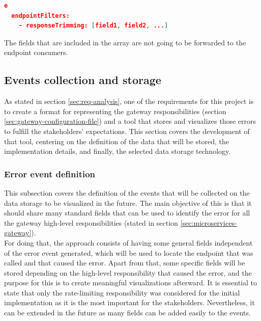 \documentclass[english, 12pt, a4paper, sci, utf8, a-1b, online]{aaltothesis}
\begin{document}
\begin{lstlisting}[language=json,firstnumber=1]e
  endpointFilters:
    - responseTrimming: [field1, field2, ...]
\end{lstlisting}

The fields that are included in the array are not going to be forwarded to the endpoint consumers.


\subsection{Events collection and storage}



As stated in section \ref{sec:req-analysis}, one of the requirements for this project is to create a format for representing the gateway responsibilities (section \ref{sec:gateway-configuration-file}) and a tool that stores and visualizes those errors to fulfill the stakeholders' expectations. This section covers the development of that tool, centering on the definition of the data that will be stored, the implementation details, and finally, the selected data storage technology.

\subsubsection{Error event definition}
\label{sec:error-event-definition}

This subsection covers the definition of the events that will be collected on the data storage to be visualized in the future. The main objective of this is that it should share many standard fields that can be used to identify the error for all the gateway high-level responsibilities (stated in section \ref{sec:microservices-gateway}).\\

For doing that, the approach consists of having some general fields independent of the error event generated, which will be used to locate the endpoint that was called and that caused the error. Apart from that, some specific fields will be stored depending on the high-level responsibility that caused the error, and the purpose for this is to create meaningful visualizations afterward. It is essential to state that only the rate-limiting responsibility was considered for the initial implementation as it is the most important for the stakeholders. Nevertheless, it can be extended in the future as many fields can be added easily to the events.\\
\end{document}
